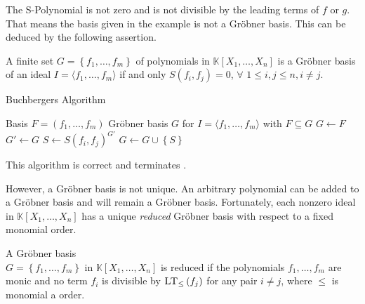 The S-Polynomial is not zero and is not divisible by the leading terms of $f$ or $g$. That means the basis given in the example is not a Gröbner basis. This can be deduced by the following assertion.

\begin{env_definition}
\cite{KHZ} A finite set $G = \left\lbrace f_{1}, \dots , f_{m} \right\rbrace$ of polynomials in $ \mathbb{K}\left[X_{1}, \dots, X_{n}\right] $ is a Gröbner basis of an ideal 
$I = \langle f_{1}, \dots , f_{m} \rangle $ if and only $S\left( f_{i},f_{j}\right) = 0$, $ \forall$  $1 \leq i,j \leq n, i\neq j.$

\end{env_definition}

\begin{algorithm}
\caption{Buchbergers Algorithm \cite{KHZ}}
\label{alg:buchberger}
\begin{algorithmic}[1]
\Require Basis $F = \left( f_{1}, \dots, f_{m} \right)  $
\Ensure Gröbner basis $G$ for $I = \langle f_{1}, \dots, f_{m} \rangle $ with $ F \subseteq G $
\State $G \gets F$
\Repeat
\State $G'\gets G $
\State $S \gets S\left( f_{i},f_{j} \right)^{G'}  $ 
\State $G \gets G \cup \left\lbrace S\right\rbrace $
\EndIf
\EndFor
{}

\end{algorithmic}
\end{algorithm}

This algorithm is correct and terminates \cite{KHZ}.

\newpage

However, a Gröbner basis is not unique. An arbitrary polynomial can be added to a Gröbner basis and will remain a Gröbner basis.
Fortunately, each nonzero ideal in $\mathbb{K}\left[X_{1}, \dots, X_{n}\right]$ has a unique \textit{reduced} Gröbner basis with respect to a fixed monomial order.

\begin{env_definition}
\cite{KHZ}
A Gröbner basis \\ $G= \left\lbrace  f_{1}, \dots , f_{m} \right\rbrace  $ in 
$ \mathbb{K}\left[X_{1}, \dots, X_{n}\right] $ is reduced if the polynomials $f_{1},\dots , f_{m} $ are monic and no term $f_{i}$ is divisible by $ \textsc{LT}_{\leq }\left( f_{j}\right)$ for any pair $i\neq j$, where $\leq$ is monomial a order.
\end{env_definition}


